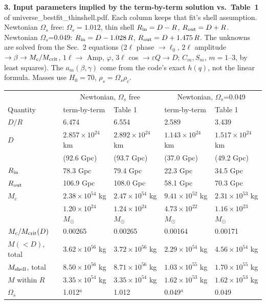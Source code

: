 \documentclass[10pt]{article}
\begin{document}
{\small
\textbf{3. Input parameters implied by the term-by-term solution vs.\ Table~1} of universe\_bestfit\_thinshell.pdf. Each column keeps that fit's shell assumption. Newtonian $\Omega_s$ free: $\Omega_s=1.012$, thin shell $R_{\rm in}=D-R$, $R_{\rm out}=D+R$. Newtonian $\Omega_s$=0.049: $R_{\rm in}=D-1.028\,R$, $R_{\rm out}=D+1.475\,R$. The unknowns are solved from the Sec.~2 equations ($2\ell$ phase $\to\ell_0$, $2\ell$ amplitude $\to\beta\to M_c/M_{\rm crit}$, $1\ell\to$ Amp, $\varphi$, $3\ell$ cos $\to\varepsilon Q\to D$; $C_m,S_m$, $m=1$--3, by least squares). The $a_m(\beta,\gamma)$ come from the code's exact $h(q)$, not the linear formula. Masses use $H_0=70$, $\rho_s=\Omega_s\rho_c$.
\begin{center}\footnotesize\setlength{\tabcolsep}{5pt}\begin{tabular}{lllll}\toprule
 & \multicolumn{2}{c}{Newtonian, $\Omega_s$ free} & \multicolumn{2}{c}{Newtonian, $\Omega_s$=0.049}\\
Quantity & term-by-term & Table 1 & term-by-term & Table 1\\\midrule
$D/R$ & 6.474 & 6.554 & 2.589 & 3.439\\
$D$ & $2.857{\times}10^{24}$ km & $2.892{\times}10^{24}$ km & $1.143{\times}10^{24}$ km & $1.517{\times}10^{24}$ km\\
 & (92.6 Gpc) & (93.7 Gpc) & (37.0 Gpc) & (49.2 Gpc)\\
$R_{\rm in}$ & 78.3 Gpc & 79.4 Gpc & 22.3 Gpc & 34.5 Gpc\\
$R_{\rm out}$ & 106.9 Gpc & 108.0 Gpc & 58.1 Gpc & 70.3 Gpc\\
$M_c$ & $2.38{\times}10^{54}$ kg & $2.47{\times}10^{54}$ kg & $9.41{\times}10^{52}$ kg & $2.31{\times}10^{53}$ kg\\
 & $1.20{\times}10^{24}$ $M_\odot$ & $1.24{\times}10^{24}$ $M_\odot$ & $4.73{\times}10^{22}$ $M_\odot$ & $1.16{\times}10^{23}$ $M_\odot$\\
$M_c/M_{\rm crit}(D)$ & 0.00265 & 0.00265 & 0.00164 & 0.00171\\
$M(<D)$, total & $3.62{\times}10^{56}$ kg & $3.72{\times}10^{56}$ kg & $2.29{\times}10^{54}$ kg & $4.56{\times}10^{54}$ kg\\
$M_{\rm shell}$, total & $8.50{\times}10^{56}$ kg & $8.71{\times}10^{56}$ kg & $1.03{\times}10^{55}$ kg & $1.70{\times}10^{55}$ kg\\
$M$ within $R$ & $3.35{\times}10^{54}$ kg & $3.35{\times}10^{54}$ kg & $1.62{\times}10^{53}$ kg & $1.62{\times}10^{53}$ kg\\
$\Omega_s$ & 1.012$^a$ & 1.012 & 0.049$^a$ & 0.049\\

\end{tabular}
\end{center}}
\end{document}

